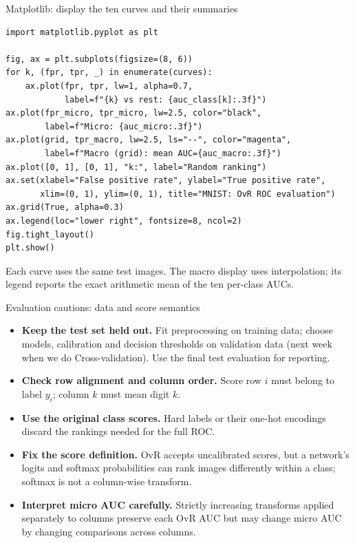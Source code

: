 \documentclass[aspectratio=169,11pt]{beamer}
\begin{document}
\begin{frame}[fragile]{Matplotlib: display the ten curves and their summaries}
\begin{lstlisting}
import matplotlib.pyplot as plt

fig, ax = plt.subplots(figsize=(8, 6))
for k, (fpr, tpr, _) in enumerate(curves):
    ax.plot(fpr, tpr, lw=1, alpha=0.7,
            label=f"{k} vs rest: {auc_class[k]:.3f}")
ax.plot(fpr_micro, tpr_micro, lw=2.5, color="black",
        label=f"Micro: {auc_micro:.3f}")
ax.plot(grid, tpr_macro, lw=2.5, ls="--", color="magenta",
        label=f"Macro (grid): mean AUC={auc_macro:.3f}")
ax.plot([0, 1], [0, 1], "k:", label="Random ranking")
ax.set(xlabel="False positive rate", ylabel="True positive rate",
       xlim=(0, 1), ylim=(0, 1), title="MNIST: OvR ROC evaluation")
ax.grid(True, alpha=0.3)
ax.legend(loc="lower right", fontsize=8, ncol=2)
fig.tight_layout()
plt.show()
\end{lstlisting}
\small Each curve uses the same test images. The macro display uses interpolation;
its legend reports the exact arithmetic mean of the ten per-class AUCs.
\end{frame}

\begin{frame}{Evaluation cautions: data and score semantics}
\begin{itemize}
\item \textbf{Keep the test set held out.} Fit preprocessing on training data;
      choose models, calibration and decision thresholds on validation data (next week when we do Cross-validation).
      Use the final test evaluation for reporting.
\item \textbf{Check row alignment and column order.} Score row $i$ must belong
      to label $y_i$; column $k$ must mean digit $k$.
\item \textbf{Use the original class scores.} Hard labels or their one-hot
      encodings discard the rankings needed for the full ROC.
\item \textbf{Fix the score definition.} OvR accepts uncalibrated scores,
      but a network's logits and softmax probabilities can rank images
      differently within a class; softmax is not a column-wise transform.
\item \textbf{Interpret micro AUC carefully.} Strictly increasing transforms
      applied separately to columns preserve each OvR AUC but may change
      micro AUC by changing comparisons across columns.
\end{itemize}
\end{frame}
\end{document}
